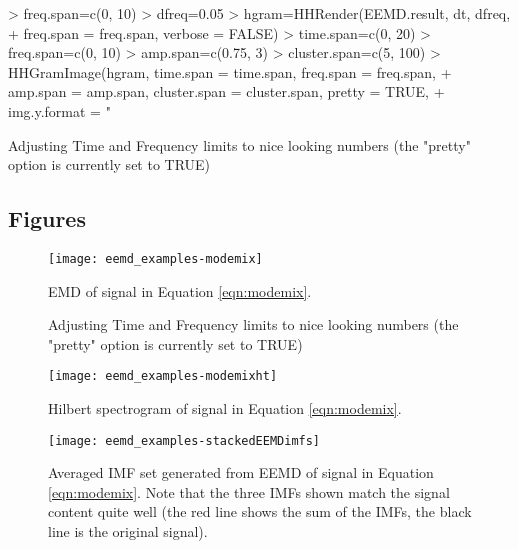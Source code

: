 \documentclass[12pt]{article}
\begin{document}
\begin{Schunk}
\begin{Sinput}
> freq.span=c(0, 10)
> dfreq=0.05
> hgram=HHRender(EEMD.result, dt, dfreq, 
+     freq.span = freq.span, verbose = FALSE)
> time.span=c(0, 20)
> freq.span=c(0, 10)
> amp.span=c(0.75, 3)
> cluster.span=c(5, 100)
> HHGramImage(hgram, time.span = time.span, freq.span = freq.span, 
+     amp.span = amp.span, cluster.span = cluster.span, pretty = TRUE,
+     img.y.format = "%.0f", img.x.format = "%.0f")
\end{Sinput}
\begin{Soutput}
Adjusting Time and Frequency limits to nice looking numbers (the "pretty" option is currently set to TRUE)
\end{Soutput}
\end{Schunk}

\subsection{Figures}

\FloatBarrier

\begin{figure}[ht]
\begin{center}
\texttt{[image: eemd\_examples-modemix]}
\end{center}
\caption{EMD of signal in Equation \ref{eqn:modemix}.}
\label{fig:modemix}
\end{figure}

\begin{figure}[ht]
\begin{center}
\begin{Schunk}
\begin{Soutput}
Adjusting Time and Frequency limits to nice looking numbers (the "pretty" option is currently set to TRUE)
\end{Soutput}
\end{Schunk}
\texttt{[image: eemd\_examples-modemixht]}
\end{center}
\caption{Hilbert spectrogram of signal in Equation \ref{eqn:modemix}.}
\label{fig:modemixht}
\end{figure}

\begin{figure}[ht]
\begin{center}
\texttt{[image: eemd\_examples-stackedEEMDimfs]}
\end{center}
\caption{Averaged IMF set generated from EEMD of signal in Equation \ref{eqn:modemix}.
Note that the three IMFs shown match the signal content quite well (the red line shows the sum of the IMFs, the black line is the original signal).}
\label{fig:stackedEEMDimfs}
\end{figure}
\end{document}
